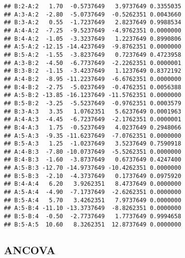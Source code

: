 \documentclass[table,10pt]{beamer}\usepackage[]{graphicx}\usepackage[]{color}
\makeatletter
\newenvironment{kframe}{%
 \def\at@end@of@kframe{}%
 \ifinner\ifhmode%
  \def\at@end@of@kframe{\end{minipage}}%
  \begin{minipage}{\columnwidth}%
 \fi\fi%
 \def\FrameCommand##1{\hskip\@totalleftmargin \hskip-\fboxsep
 \colorbox{shadecolor}{##1}\hskip-\fboxsep
     \hskip-\linewidth \hskip-\@totalleftmargin \hskip\columnwidth}%
 \MakeFramed {\advance\hsize-\width
   \@totalleftmargin\z@ \linewidth\hsize
   \@setminipage}}%
 {\par\unskip\endMakeFramed%
 \at@end@of@kframe}
\newenvironment{knitrout}{}{} %
\makeatother
\begin{document}
\begin{CJK*}{UTF8}{gbsn}
\begin{frame}[t,containsverbatim]
\begin{knitrout}
\begin{kframe}
\begin{verbatim}
## B:2-A:2   1.70  -0.5737649   3.9737649 0.3355035
## A:3-A:2  -2.80  -5.0737649  -0.5262351 0.0043660
## B:3-A:2   0.55  -1.7237649   2.8237649 0.9988534
## A:4-A:2  -7.25  -9.5237649  -4.9762351 0.0000000
## B:4-A:2  -1.05  -3.3237649   1.2237649 0.8990806
## A:5-A:2 -12.15 -14.4237649  -9.8762351 0.0000000
## B:5-A:2  -1.55  -3.8237649   0.7237649 0.4723958
## A:3-B:2  -4.50  -6.7737649  -2.2262351 0.0000001
## B:3-B:2  -1.15  -3.4237649   1.1237649 0.8372192
## A:4-B:2  -8.95 -11.2237649  -6.6762351 0.0000000
## B:4-B:2  -2.75  -5.0237649  -0.4762351 0.0056388
## A:5-B:2 -13.85 -16.1237649 -11.5762351 0.0000000
## B:5-B:2  -3.25  -5.5237649  -0.9762351 0.0003579
## B:3-A:3   3.35   1.0762351   5.6237649 0.0001963
## A:4-A:3  -4.45  -6.7237649  -2.1762351 0.0000001
## B:4-A:3   1.75  -0.5237649   4.0237649 0.2948066
## A:5-A:3  -9.35 -11.6237649  -7.0762351 0.0000000
## B:5-A:3   1.25  -1.0237649   3.5237649 0.7590918
## A:4-B:3  -7.80 -10.0737649  -5.5262351 0.0000000
## B:4-B:3  -1.60  -3.8737649   0.6737649 0.4247400
## A:5-B:3 -12.70 -14.9737649 -10.4262351 0.0000000
## B:5-B:3  -2.10  -4.3737649   0.1737649 0.0975920
## B:4-A:4   6.20   3.9262351   8.4737649 0.0000000
## A:5-A:4  -4.90  -7.1737649  -2.6262351 0.0000000
## B:5-A:4   5.70   3.4262351   7.9737649 0.0000000
## A:5-B:4 -11.10 -13.3737649  -8.8262351 0.0000000
## B:5-B:4  -0.50  -2.7737649   1.7737649 0.9994658
## B:5-A:5  10.60   8.3262351  12.8737649 0.0000000
\end{verbatim}
\end{kframe}
\end{knitrout}
\end{frame}

\subsection{ANCOVA}


\end{CJK*}
\end{document}
